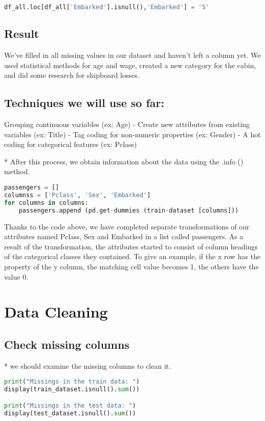 \documentclass[onecolumn]{article}
\begin{document}
\begin{lstlisting}[language=Python, caption=  embarked ] 
df_all.loc[df_all['Embarked'].isnull(),'Embarked'] = 'S'
\end{lstlisting}


\subsection{Result}

We've filled in all missing values ​​in our dataset and haven't left a column yet. We used statistical methods for age and wage, created a new category for the cabin, and did some research for shipboard losses.\\
\subsection{Techniques we will use so far:}
Grouping continuous variables (ex: Age)
- Create new attributes from existing variables (ex: Title)
- Tag coding for non-numeric properties (ex: Gender)
- A hot coding for categorical features (ex: Pclass)

* After this process, we obtain information about the data using the .info () method.
\begin{lstlisting}[language=Python, caption= get-dummies] 
passengers = []
columnss = ['Pclass', 'Sex', 'Embarked'] 
for columns in columns:
	passengers.append (pd.get-dummies (train-dataset [columns])) 
    \end{lstlisting}

Thanks to the code above, we have completed separate transformations of our attributes named Pclass, Sex and Embarked in a list called passengers. As a result of the transformation, the attributes started to consist of column headings of the categorical classes they contained. To give an example, if the x row has the property of the y column, the matching cell value becomes 1, the others have the value 0.
\section{Data Cleaning}

\subsection{Check missing columns}

* we should examine the missing columns to clean it.

\begin{lstlisting}[language=Python, caption= missing columns] 
print("Missings in the train data: ")
display(train_dataset.isnull().sum())

print("Missings in the test data: ") 
display(test_dataset.isnull().sum())
\end{lstlisting}
\end{document}
